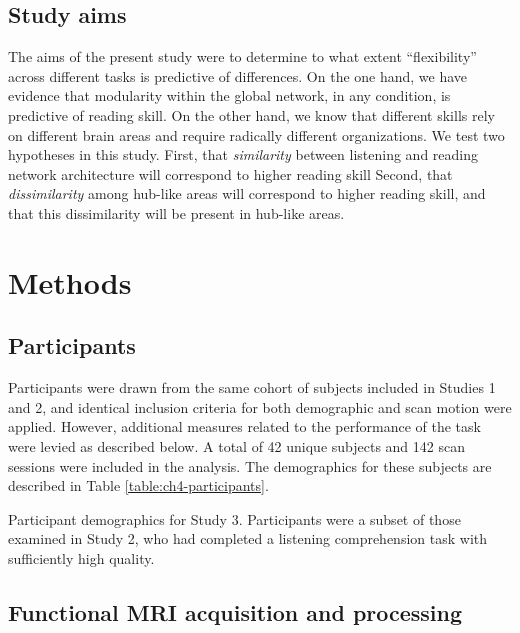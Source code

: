 \subsection{Study aims}

The aims of the present study were to determine to what extent ``flexibility'' across different tasks is predictive of differences. On the one hand, we have evidence that modularity within the global network, in any condition, is predictive of reading skill. On the other hand, we know that different skills rely on different brain areas and require radically different organizations. We test two hypotheses in this study. First, that \textit{similarity} between listening and reading network architecture will correspond to higher reading skill Second, that \textit{dissimilarity} among hub-like areas will correspond to higher reading skill, and that this dissimilarity will be present in hub-like areas. 

\section{Methods}

\subsection{Participants}

Participants were drawn from the same cohort of subjects included in Studies 1 and 2, and identical inclusion criteria for both demographic and scan motion were applied. However, additional measures related to the performance of the task were levied as described below. A total of 42 unique subjects and 142 scan sessions were included in the analysis. The demographics for these subjects are described in Table \ref{table:ch4-participants}.

\begin{table}[t]
	\renewcommand{\tabcolsep}{0.09cm}
	\centering
	
	\caption[Participant demographics for Study 3.]{Participant demographics for Study 3. Participants were a subset of those examined in Study 2, who had completed a listening comprehension task with sufficiently high quality.}
	\label{table:ch4-participants}
\end{table}

\subsection{Functional MRI acquisition and processing}

